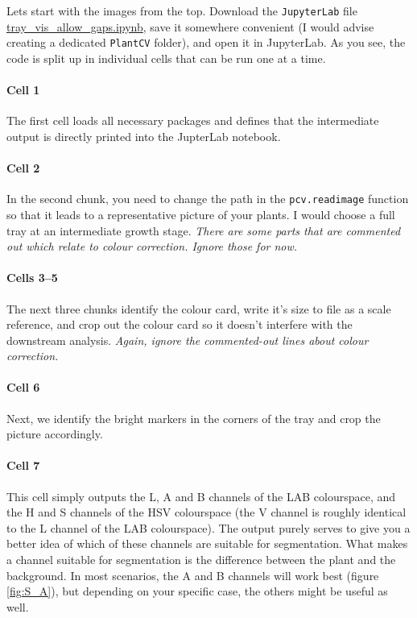 \documentclass[10pt]{article}
\begin{document}
Lets start with the images from the top. Download the \texttt{JupyterLab} file \href{https://github.com/leonardblaschek/plantcv/blob/06e4e001111b82e5dbaff17217257d8c75d22bbc/tray_vis_allow_gaps.ipynb}{tray\_vis\_allow\_gaps.ipynb}, save it somewhere convenient (I would advise creating a dedicated \texttt{PlantCV} folder), and open it in JupyterLab. As you see, the code is split up in individual cells that can be run one at a time. 

\paragraph*{Cell 1} The first cell loads all necessary packages and defines that the intermediate output is directly printed into the JupterLab notebook.

\paragraph*{Cell 2} In the second chunk, you need to change the path in the \texttt{pcv.readimage} function so that it leads to a representative picture of your plants. I would choose a full tray at an intermediate growth stage. \textit{There are some parts that are commented out which relate to colour correction. Ignore those for now.}

\paragraph*{Cells 3--5} The next three chunks identify the colour card, write it's size to file as a scale reference, and crop out the colour card so it doesn't interfere with the downstream analysis. \textit{Again, ignore the commented-out lines about colour correction.}

\paragraph*{Cell 6} Next, we identify the bright markers in the corners of the tray and crop the picture accordingly.

\paragraph*{Cell 7} This cell simply outputs the L, A and B channels of the LAB colourspace, and the H and S channels of the HSV colourspace (the V channel is roughly identical to the L channel of the LAB colourspace). The output purely serves to give you a better idea of which of these channels are suitable for segmentation. What makes a channel suitable for segmentation is the difference between the plant and the background. In most scenarios, the A and B channels will work best (figure \ref{fig:S_A}), but depending on your specific case, the others might be useful as well.
\end{document}
